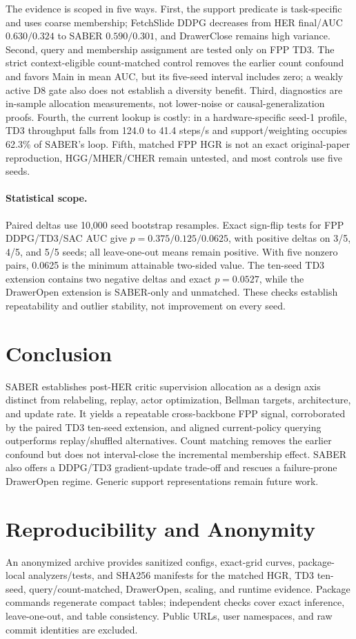 \documentclass[letterpaper]{article}
\begin{document}
The evidence is scoped in five ways. First, the support predicate is task-specific and uses coarse membership; FetchSlide DDPG decreases from HER final/AUC \(0.630/0.324\) to SABER \(0.590/0.301\), and DrawerClose remains high variance. Second, query and membership assignment are tested only on FPP TD3. The strict context-eligible count-matched control removes the earlier count confound and favors Main in mean AUC, but its five-seed interval includes zero; a weakly active D8 gate also does not establish a diversity benefit. Third, diagnostics are in-sample allocation measurements, not lower-noise or causal-generalization proofs. Fourth, the current lookup is costly: in a hardware-specific seed-1 profile, TD3 throughput falls from 124.0 to 41.4 steps/s and support/weighting occupies 62.3\% of SABER's loop. Fifth, matched FPP HGR is not an exact original-paper reproduction, HGG/MHER/CHER remain untested, and most controls use five seeds.

\paragraph{Statistical scope.}
Paired deltas use 10,000 seed bootstrap resamples. Exact sign-flip tests for FPP DDPG/TD3/SAC AUC give $p=0.375/0.125/0.0625$, with positive deltas on 3/5, 4/5, and 5/5 seeds; all leave-one-out means remain positive. With five nonzero pairs, 0.0625 is the minimum attainable two-sided value. The ten-seed TD3 extension contains two negative deltas and exact $p=0.0527$, while the DrawerOpen extension is SABER-only and unmatched. These checks establish repeatability and outlier stability, not improvement on every seed.

\section{Conclusion}
SABER establishes post-HER critic supervision allocation as a design axis distinct from relabeling, replay, actor optimization, Bellman targets, architecture, and update rate. It yields a repeatable cross-backbone FPP signal, corroborated by the paired TD3 ten-seed extension, and aligned current-policy querying outperforms replay/shuffled alternatives. Count matching removes the earlier confound but does not interval-close the incremental membership effect. SABER also offers a DDPG/TD3 gradient-update trade-off and rescues a failure-prone DrawerOpen regime. Generic support representations remain future work.

\section{Reproducibility and Anonymity}

An anonymized archive provides sanitized configs, exact-grid curves, package-local analyzers/tests, and SHA256 manifests for the matched HGR, TD3 ten-seed, query/count-matched, DrawerOpen, scaling, and runtime evidence. Package commands regenerate compact tables; independent checks cover exact inference, leave-one-out, and table consistency. Public URLs, user namespaces, and raw commit identities are excluded.

\makeatletter
{}
\makeatother

\end{document}
